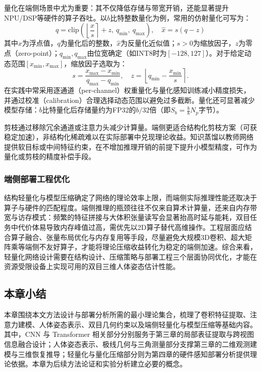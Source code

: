量化在端侧场景中尤为重要：其不仅降低存储与带宽开销，还能显著提升NPU/DSP等硬件的算子吞吐。以$b$比特整数量化为例，常用的仿射量化可写为：
\begin{equation}
q = \mathrm{clip}\!\left(\left\lfloor \frac{x}{s} \right\rceil + z,\ q_{\min},\ q_{\max}\right),\quad
\hat{x} = s \left(q - z\right)
\label{eq:affine_quant}
\end{equation}
其中$x$为浮点值，$q$为量化后的整数，$\hat{x}$为反量化近似值；$s>0$为缩放因子，$z$为零点（zero-point）；$q_{\min}, q_{\max}$由位宽确定（如INT8时为$[-128,127]$）。对于给定动态范围$[x_{\min},x_{\max}]$，缩放因子选取为：
\begin{equation}
s = \frac{x_{\max}-x_{\min}}{q_{\max}-q_{\min}},\quad
z = \left\lfloor q_{\min} - \frac{x_{\min}}{s}\right\rceil .
\label{eq:quant_param}
\end{equation}
在实践中常采用逐通道（per-channel）权重量化与量化感知训练减小精度损失，并通过校准（calibration）合理选择动态范围以避免过多截断。量化还可显著减少模型存储：$b$比特量化后存储量约为FP32的$b/32$倍（即$S_b = \frac{b}{8}N_p$字节）。

剪枝通过移除冗余通道或注意力头减少计算量。端侧更适合结构化剪枝方案（可获稳定加速），非结构化稀疏难以在实际部署中兑现理论收益。知识蒸馏以教师网络提供软目标或中间特征约束，在不增加推理开销的前提下提升小模型精度，可作为量化或剪枝的精度补偿手段。

\subsubsection{端侧部署工程优化}
结构轻量化与模型压缩确定了网络的理论效率上限，而端侧实际推理性能还取决于算子与硬件的匹配程度。端侧推理的瓶颈往往不仅来自算术计算量，还来自内存带宽与访存模式：频繁的特征拼接与大体积张量读写会显著抬高时延与能耗，双目任务中代价体易导致内存峰值过高，需优先以2D算子替代高维操作。工程层面应结合算子融合、张量布局优化与内存复用等手段，尽量避免大规模3D卷积、超大矩阵乘等端侧不友好算子，才能将理论压缩收益转化为稳定的端侧加速。综合来看，轻量化网络设计需要在结构设计、压缩策略与部署工程三个层面协同优化，才能在资源受限设备上实现可用的双目三维人体姿态估计性能。


\subsection{本章小结}

本章围绕本文方法设计与部署分析所需的最小理论集合，梳理了卷积特征提取、注意力建模、人体姿态表示、双目几何约束以及端侧轻量化与模型压缩等基础内容。其中，CNN 与 Transformer 相关部分分别服务于第三章的局部表征提取与跨视图信息融合设计；人体姿态表示、极线几何与三角测量部分支撑第三章的二维观测建模与三维恢复推导；轻量化与量化压缩部分则为第四章的硬件感知部署分析提供理论依据。本章为后续方法论证和实验分析建立必要的概念。

